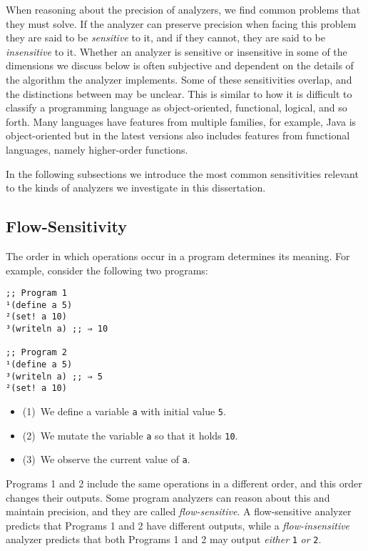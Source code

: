 \documentclass[12pt, oneside]{book}
\begin{document}
When reasoning about the precision of analyzers, we find common problems that they must solve. If the analyzer can preserve precision when facing this problem they are said to be \emph{sensitive} to it, and if they cannot, they are said to be \emph{insensitive} to it. Whether an analyzer is sensitive or insensitive in some of the dimensions we discuss below is often subjective and dependent on the details of the algorithm the analyzer implements. Some of these sensitivities overlap, and the distinctions between may be unclear. This is similar to how it is difficult to classify a programming language as object-oriented, functional, logical, and so forth. Many languages have features from multiple families, for example, Java is object-oriented but in the latest versions also includes features from functional languages, namely higher-order functions.

In the following subsections we introduce the most common sensitivities relevant to the kinds of analyzers we investigate in this dissertation.

\subsection{Flow-Sensitivity}
\label{section:flow-sensitivity}

The order in which operations occur in a program determines its meaning. For example, consider the following two programs:

\begin{Verbatim}
;; Program 1
¹(define a 5)
²(set! a 10)
³(writeln a) ;; ⇒ 10

;; Program 2
¹(define a 5)
³(writeln a) ;; ⇒ 5
²(set! a 10)
\end{Verbatim}

\begin{itemize}
  \item (1)~We define a variable \texttt{a} with initial value \texttt{5}.
  \item (2)~We mutate the variable \texttt{a} so that it holds \texttt{10}.
  \item (3)~We observe the current value of \texttt{a}.
\end{itemize}

Programs 1 and 2 include the same operations in a different order, and this order changes their outputs. Some program analyzers can reason about this and maintain precision, and they are called \emph{flow-sensitive}. A flow-sensitive analyzer predicts that Programs 1 and 2 have different outputs, while a \emph{flow-insensitive} analyzer predicts that both Programs 1 and 2 may output \emph{either} \texttt{1} \emph{or} \texttt{2}.
\end{document}
